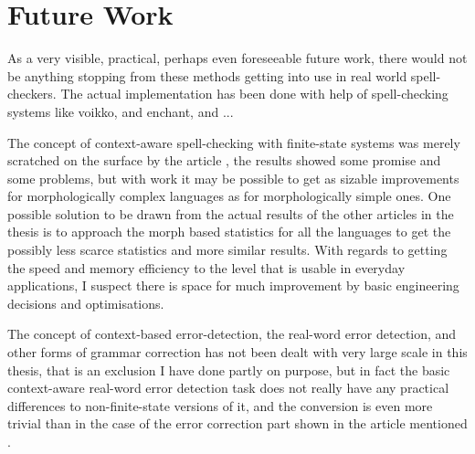 \documentclass[officiallayout,draft]{unihelcompling}
\begin{document}
\section{Future Work}
\label{sec:future-work}

As a very visible, practical, perhaps even foreseeable future work, there would
not be anything stopping from these methods getting into use in real world
spell-checkers. The actual implementation has been done with help of
spell-checking systems like voikko, and enchant, and ...

The concept of context-aware spell-checking with finite-state systems was
merely scratched on the surface by the article \cite{pirinen2012improving},
the results showed some promise and some problems, but with work it may be
possible to get as sizable improvements for morphologically complex languages
as for morphologically simple ones. One possible solution to be drawn from
the actual results of the other articles in the thesis is to approach the
morph based statistics for all the languages to get the possibly less scarce
statistics and more similar results. With regards to getting the speed and
memory efficiency to the level that is usable in everyday applications, I
suspect there is space for much improvement by basic engineering decisions and
optimisations.

The concept of context-based error-detection, the real-word error detection,
and other forms of grammar correction has not been dealt with very large scale
in this thesis, that is an exclusion I have done partly on purpose, but in
fact the basic context-aware real-word error detection task does not really
have any practical differences to non-finite-state versions of it, and the
conversion is even more trivial than in the case of the error correction part
shown in the article mentioned \cite{pirinen2012improving}.



\end{document}
